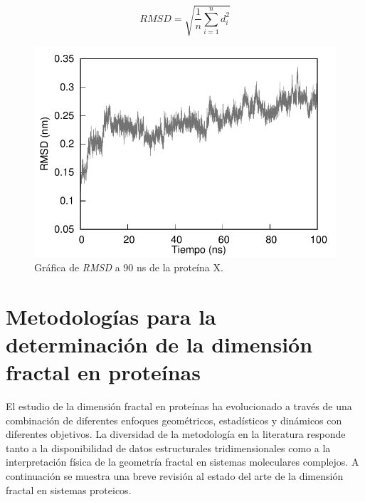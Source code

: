 	\begin{figure}[H]
	\hspace{-0.3cm} 
	\begin{minipage}{0.49\textwidth}
		\centering
		\begin{equation}
			RMSD = \sqrt{\frac{1}{n} \sum_{i=1}^{n} d_i^2}
			\label{rmsd}
		\end{equation}
	\end{minipage}
	\hspace{0.2cm}
	\begin{minipage}{0.49\textwidth}
		\centering
		\includegraphics[width=\linewidth]{graphs/rmsd.pdf}
	\end{minipage}
	\caption{Gr\'{a}fica de \textit{RMSD} a 90 ns de la prote\'{i}na X.}
	\label{rmsd-graf}
	\end{figure}


\section{Metodolog\'{i}as para la determinaci\'{o}n de la dimensi\'{o}n fractal en prote\'{i}nas}

El estudio de la dimensi\'{o}n fractal en prote\'{i}nas ha evolucionado a trav\'{e}s de una combinaci\'{o}n de diferentes enfoques geom\'{e}tricos, estad\'{i}sticos y din\'{a}micos con diferentes objetivos. La diversidad de la metodolog\'{i}a en la literatura responde tanto a la disponibilidad de datos estructurales tridimensionales como a la interpretaci\'{o}n f\'{i}sica de la geometr\'{i}a fractal en sistemas moleculares complejos. A continuaci\'{o}n se muestra una breve revisi\'{o}n al estado del arte de la dimensi\'{o}n fractal en sistemas proteicos.

